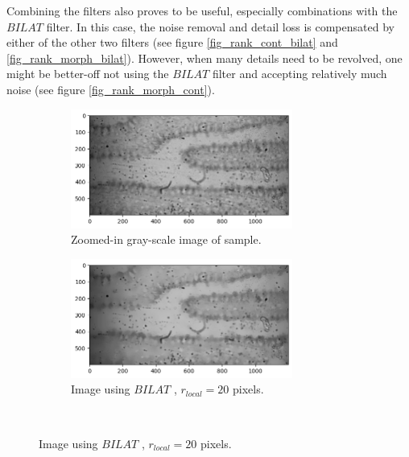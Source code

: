 Combining the filters also proves to be useful, especially combinations with the $BILAT$ filter. In this case, the noise removal and detail loss is compensated by either of the other two filters (see figure \ref{fig_rank_cont_bilat} and \ref{fig_rank_morph_bilat}). However, when many details need to be revolved, one might be better-off not using the $BILAT$ filter and accepting relatively much noise (see figure \ref{fig_rank_morph_cont}).

\begin{figure}[h!]
    \begin{subfigure}[b]{0.5\textwidth}
        \centering
        \includegraphics[width=0.8\textwidth]{afbeeldingen/rank/img.png}
        \caption{Zoomed-in gray-scale image of sample.}
        \label{fig_rank_plain}
    \end{subfigure}
    \begin{subfigure}[b]{0.5\textwidth}
        \centering
        \includegraphics[width=0.8\textwidth]{afbeeldingen/rank/img_bilat.png}
        \caption{Image using $BILAT$ , $r_{local}=20$ pixels.}
        \label{fig_rank_bilat}
    \end{subfigure}
\\


\end{figure}
